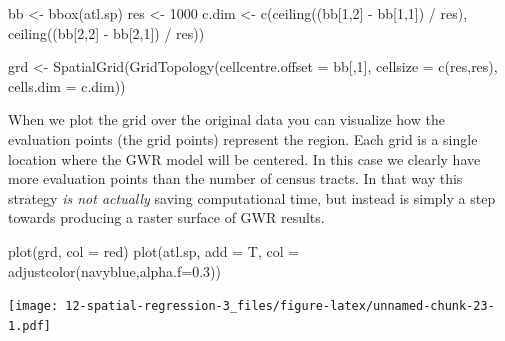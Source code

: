 \documentclass[
]{book}
\newenvironment{Shaded}{\begin{snugshade}}{\end{snugshade}}
\newcommand{\AttributeTok}[1]{\textcolor[rgb]{0.77,0.63,0.00}{#1}}
\newcommand{\DecValTok}[1]{\textcolor[rgb]{0.00,0.00,0.81}{#1}}
\newcommand{\FloatTok}[1]{\textcolor[rgb]{0.00,0.00,0.81}{#1}}
\newcommand{\FunctionTok}[1]{\textcolor[rgb]{0.00,0.00,0.00}{#1}}
\newcommand{\NormalTok}[1]{#1}
\newcommand{\OtherTok}[1]{\textcolor[rgb]{0.56,0.35,0.01}{#1}}
\newcommand{\SpecialCharTok}[1]{\textcolor[rgb]{0.00,0.00,0.00}{#1}}
\newcommand{\StringTok}[1]{\textcolor[rgb]{0.31,0.60,0.02}{#1}}
\begin{document}
\begin{Shaded}
\begin{Highlighting}[]
\NormalTok{bb }\OtherTok{\textless{}{-}} \FunctionTok{bbox}\NormalTok{(atl.sp)}
\NormalTok{res }\OtherTok{\textless{}{-}} \DecValTok{1000}
\NormalTok{c.dim }\OtherTok{\textless{}{-}} \FunctionTok{c}\NormalTok{(}\FunctionTok{ceiling}\NormalTok{((bb[}\DecValTok{1}\NormalTok{,}\DecValTok{2}\NormalTok{] }\SpecialCharTok{{-}}\NormalTok{ bb[}\DecValTok{1}\NormalTok{,}\DecValTok{1}\NormalTok{]) }\SpecialCharTok{/}\NormalTok{ res),}
           \FunctionTok{ceiling}\NormalTok{((bb[}\DecValTok{2}\NormalTok{,}\DecValTok{2}\NormalTok{] }\SpecialCharTok{{-}}\NormalTok{ bb[}\DecValTok{2}\NormalTok{,}\DecValTok{1}\NormalTok{]) }\SpecialCharTok{/}\NormalTok{ res))}

\NormalTok{grd }\OtherTok{\textless{}{-}} \FunctionTok{SpatialGrid}\NormalTok{(}\FunctionTok{GridTopology}\NormalTok{(}\AttributeTok{cellcentre.offset =}\NormalTok{ bb[,}\DecValTok{1}\NormalTok{], }
                                \AttributeTok{cellsize =} \FunctionTok{c}\NormalTok{(res,res), }
                                \AttributeTok{cells.dim =}\NormalTok{ c.dim))}
\end{Highlighting}
\end{Shaded}

When we plot the grid over the original data you can visualize how the evaluation points (the grid points) represent the region. Each grid is a single location where the GWR model will be centered. In this case we clearly have more evaluation points than the number of census tracts. In that way this strategy \emph{is not actually} saving computational time, but instead is simply a step towards producing a raster surface of GWR results.

\begin{Shaded}
\begin{Highlighting}[]
\FunctionTok{plot}\NormalTok{(grd, }\AttributeTok{col =} \StringTok{\textquotesingle{}red\textquotesingle{}}\NormalTok{)}
\FunctionTok{plot}\NormalTok{(atl.sp, }\AttributeTok{add =}\NormalTok{ T, }\AttributeTok{col =} \FunctionTok{adjustcolor}\NormalTok{(}\StringTok{\textquotesingle{}navyblue\textquotesingle{}}\NormalTok{,}\AttributeTok{alpha.f=}\FloatTok{0.3}\NormalTok{))}
\end{Highlighting}
\end{Shaded}

\texttt{[image: 12-spatial-regression-3\_files/figure-latex/unnamed-chunk-23-1.pdf]}
\end{document}
